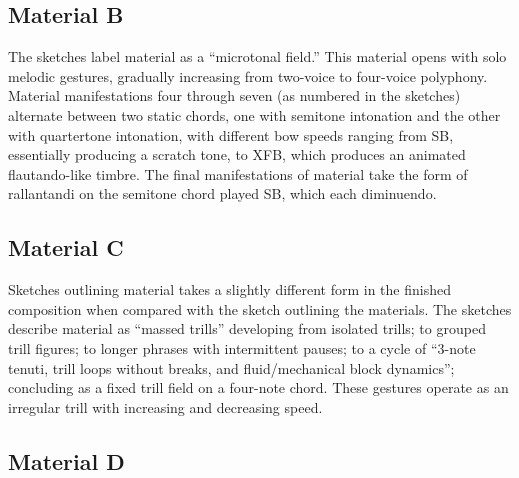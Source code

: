 \subsection{Material B}

The sketches label material  as a ``microtonal field.'' This material opens with solo melodic gestures, gradually increasing from two-voice to four-voice polyphony. Material manifestations four through seven (as numbered in the sketches) alternate between two static chords, one with semitone intonation and the other with quartertone intonation, with different bow speeds ranging from \ac{SB}, essentially producing a scratch tone, to \ac{XFB}, which produces an animated flautando-like timbre. The final manifestations of material  take the form of rallantandi on the semitone chord played \ac{SB}, which each diminuendo.

\subsection{Material C}

Sketches outlining material  takes a slightly different form in the finished composition when compared with the sketch outlining the materials. The sketches describe material  as ``massed trills'' developing from isolated trills; to grouped trill figures; to longer phrases with intermittent pauses; to a cycle of ``3-note tenuti, trill loops without breaks, and fluid/mechanical block dynamics''; concluding as a fixed trill field on a four-note chord. These gestures operate as an irregular trill with increasing and decreasing speed.

\subsection{Material D}

